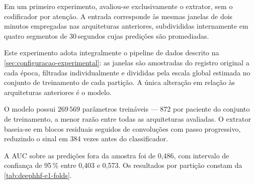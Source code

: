 Em um primeiro experimento, avaliou-se exclusivamente o extrator, sem o
codificador por atenção. A entrada corresponde às mesmas janelas de dois
minutos empregadas nas arquiteturas anteriores, subdivididas internamente em
quatro segmentos de 30\,segundos cujas predições são promediadas.

Este experimento adota integralmente o pipeline de dados descrito na
\autoref{sec:configuracao-experimental}: as janelas são amostradas do
registro original a cada época, filtradas individualmente e divididas pela
escala global estimada no conjunto de treinamento de cada partição. A única
alteração em relação às arquiteturas anteriores é o modelo.

O modelo possui $269\,569$ parâmetros treináveis --- 872 por paciente do
conjunto de treinamento, a menor razão entre todas as arquiteturas
avaliadas. O extrator baseia-se em blocos residuais seguidos de convoluções
com passo progressivo, reduzindo o sinal em 384 vezes antes do
classificador.

A \gls{AUC} sobre as predições fora da amostra foi de 0,486, com intervalo
de confiança de 95\,\% entre 0,403 e 0,573. Os resultados por partição
constam da \autoref{tab:deephhf-e1-folds}.

